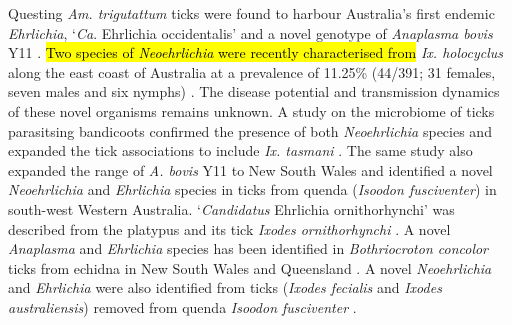 \documentclass[a4paper, nobind]{templates/ociamthesis}
\begin{document}
Questing \emph{Am. trigutattum} ticks were found to harbour Australia's first endemic \emph{Ehrlichia}, `\emph{Ca}. Ehrlichia occidentalis' and a novel genotype of \emph{Anaplasma bovis} Y11 \autocite{goftonDetectionPhylogeneticCharacterisation2017}.
\hl{Two species of \emph{Neoehrlichia} were recently characterised from} \emph{Ix. holocyclus} along the east coast of Australia at a prevalence of 11.25\% (44/391; 31 females, seven males and six nymphs) \autocite{goftonPhylogeneticCharacterisationTwo2016}.
The disease potential and transmission dynamics of these novel organisms remains unknown.
A study on the microbiome of ticks parasitsing bandicoots confirmed the presence of both \emph{Neoehrlichia} species and expanded the tick associations to include \emph{Ix. tasmani} \autocite{eganBacterialCommunityProfiling2020}.
The same study also expanded the range of \emph{A. bovis} Y11 to New South Wales and identified a novel \emph{Neoehrlichia} and \emph{Ehrlichia} species in ticks from quenda (\emph{Isoodon fusciventer}) in south-west Western Australia.
`\emph{Candidatus} Ehrlichia ornithorhynchi' was described from the platypus and its tick \emph{Ixodes ornithorhynchi} \autocite{goftonNovelEhrlichiaSpecies2018}.
A novel \emph{Anaplasma} and \emph{Ehrlichia} species has been identified in \emph{Bothriocroton concolor} ticks from echidna in New South Wales and Queensland \autocite{lohIdentificationCharacterisationMicroorganisms2018,eganBacterialCommunityProfiling2020}.
A novel \emph{Neoehrlichia} and \emph{Ehrlichia} were also identified from ticks (\emph{Ixodes fecialis} and \emph{Ixodes australiensis}) removed from quenda \emph{Isoodon fusciventer} \autocite{eganBacterialCommunityProfiling2020}.
\end{document}

